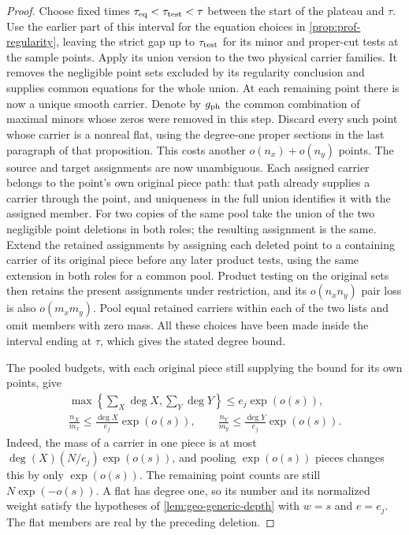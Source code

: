 \begin{proof}
Choose fixed times $\tau_{\rm eq}<\tau_{\rm test}<\tau$ between the start of the plateau and $\tau$.  Use the earlier part of this interval for the equation choices in \cref{prop:prof-regularity}, leaving the strict gap up to $\tau_{\rm test}$ for its minor and proper-cut tests at the sample points.  Apply its union version to the two physical carrier families. It removes the negligible point sets excluded by its regularity conclusion and supplies common equations for the whole union.  At each remaining point there is now a unique smooth carrier.  Denote by $g_{\rm ph}$ the common combination of maximal minors whose zeros were removed in this step.  Discard every such point whose carrier is a nonreal flat, using the degree-one proper sections in the last paragraph of that proposition.  This costs another $o(n_x)+o(n_y)$ points.  The source and target assignments are now unambiguous.  Each assigned carrier belongs to the point's own original piece path: that path already supplies a carrier through the point, and uniqueness in the full union identifies it with the assigned member. For two copies of the same pool take the union of the two negligible point deletions in both roles; the resulting assignment is the same. Extend the retained assignments by assigning each deleted point to a containing carrier of its original piece before any later product tests, using the same extension in both roles for a common pool.  Product testing on the original sets then retains the present assignments under restriction, and its $o(n_xn_y)$ pair loss is also $o(m_xm_y)$.  Pool equal retained carriers within each of the two lists and omit members with zero mass. All these choices have been made inside the interval ending at $\tau$, which gives the stated degree bound.

The pooled budgets, with each original piece still supplying the bound for its own points, give
\begin{equation}\label{eq:sc-retained-carrier-weights}
 \begin{gathered}
 \max\left\{\sum_X\deg X,\sum_Y\deg Y\right\}\le e_j\exp(o(s)),\\
 \frac{n_X}{m_x}\le\frac{\deg X}{e_j}\exp(o(s)),\qquad
 \frac{n_Y}{m_y}\le\frac{\deg Y}{e_j}\exp(o(s)).
 \end{gathered}
\end{equation}
Indeed, the mass of a carrier in one piece is at most $\deg(X)(N/e_j)\exp(o(s))$, and pooling $\exp(o(s))$ pieces changes this by only $\exp(o(s))$.  The remaining point counts are still $N\exp(-o(s))$.  A flat has degree one, so its number and its normalized weight satisfy the hypotheses of \cref{lem:geo-generic-depth} with $w=s$ and $e=e_j$.  The flat members are real by the preceding deletion.


\end{proof}
